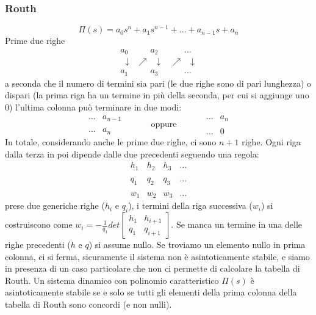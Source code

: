 \begin{landscape}
\begin{multicols*}{3}
    \subsubsection*{Routh}
    \[
        \Pi(s) = a_0s^n + a_1 s^{n-1} + \dots + a_{n-1}s + a_n
    \]
    Prime due righe
    \[
        \begin{matrix}
            a_0 & \;\;\;\;\;\; a_2 & \;\;\;\;\;\;\dots\\
            \;\;\downarrow & \nearrow \;\; \downarrow & \nearrow \;\; \downarrow\\
            a_1 & \;\;\;\;\;\; a_3 & \;\;\;\;\;\;\dots 
        \end{matrix}
    \]
    a seconda che il numero di termini sia pari (le due righe sono di pari lunghezza) o dispari (la prima riga ha un termine in più della seconda, per cui si aggiunge uno $0$) l'ultima colonna può terminare in due modi:
    \[
        \begin{matrix}
            \dots & a_{n-1}\\
            \;\\
            \dots & a_n
        \end{matrix}\;\;\;\;\;\;\;\;\;\;\; \text{oppure}\;\;\;\;\;\;\;\;\;\;\; \begin{matrix}
            \dots &a_n\\
            \;\\
            \dots & 0 
        \end{matrix}
    \]
    In totale, considerando anche le prime due righe, ci sono $n+1$ righe.\newline
    Ogni riga dalla terza in poi dipende dalle due precedenti seguendo una regola:
    \[
        \begin{matrix}
            h_1 & h_2 & h_3 &\dots\\
            \;\\
            q_1 & q_2 & q_3 & \dots\\
            \;\\
            w_1 & w_2 & w_3 & \dots
        \end{matrix}
    \]
    prese due generiche righe ($h_i$ e $q_i$), i termini della riga successiva ($w_i$) si costruiscono come $w_i = - \frac{1}{q_1} det\left[\begin{matrix}
        h_1 & h_{i+1} \\
        q_1 & q_{i+1}
    \end{matrix}\right]$.\newline
    Se manca un termine in una delle righe precedenti ($h$ e $q$) si assume nullo.\newline
    Se troviamo un elemento nullo in prima colonna, ci si ferma, sicuramente il sistema non è asintoticamente stabile, e siamo in presenza di un caso particolare che non ci permette di calcolare la tabella di Routh.\newline
    \newline
    Un sistema dinamico con polinomio caratteristico $\Pi(s)$ è asintoticamente stabile se e solo se tutti gli elementi della prima colonna della tabella di Routh sono concordi (e non nulli).
\end{multicols*}
\end{landscape}